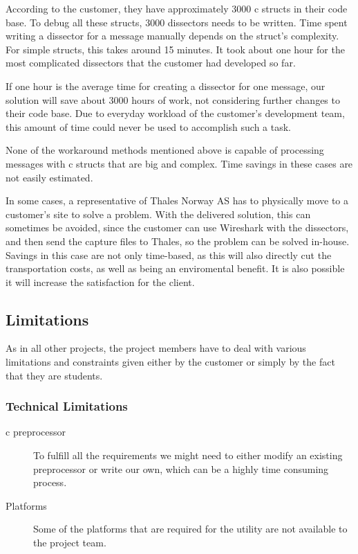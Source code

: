 According to the customer, they have approximately 3000 \Gls{c} \glspl{struct} in their code base.
To debug all these structs, 3000 \glspl{dissector} needs to be written. Time spent writing a \gls{dissector} for a message manually depends on the \gls{struct}’s complexity. For simple \glspl{struct}, this takes around 15 minutes. It took about one hour for the most complicated \glspl{dissector} that the customer had developed so far.

If one hour is the average time for creating a \gls{dissector} for one message, our solution will save about 3000 hours of work, not considering further changes to their code base. Due to everyday workload of the customer’s development team, this amount of time could never be used to accomplish such a task.

None of the workaround methods mentioned above is capable of processing messages with \Gls{c} \glspl{struct} that are big and complex. Time savings in these cases are not easily estimated.

In some cases, a representative of Thales Norway AS has to physically move to a customer’s site to solve a problem.
With the delivered solution, this can sometimes be avoided, since the customer can use Wireshark with the dissectors, and then send the capture files to Thales, so the problem can be solved in-house. Savings in this case are not only time-based, as this will also directly cut the transportation costs, as well as being an enviromental benefit. It is also possible it will increase the satisfaction for the client.

\subsection{Limitations}
As in all other projects, the project members have to deal with various limitations and constraints given either by the customer or simply by the fact that they are students.

\subsubsection{Technical Limitations}
\begin{description}
	\item[\Gls{c} \gls{preprocessor}] To fulfill all the requirements we might need to
		either modify an existing \gls{preprocessor} or write our own, which can be
		a highly time consuming process.
	\item[Platforms] Some of the platforms that are required for the utility are not
		available to the project team.
\end{description}

